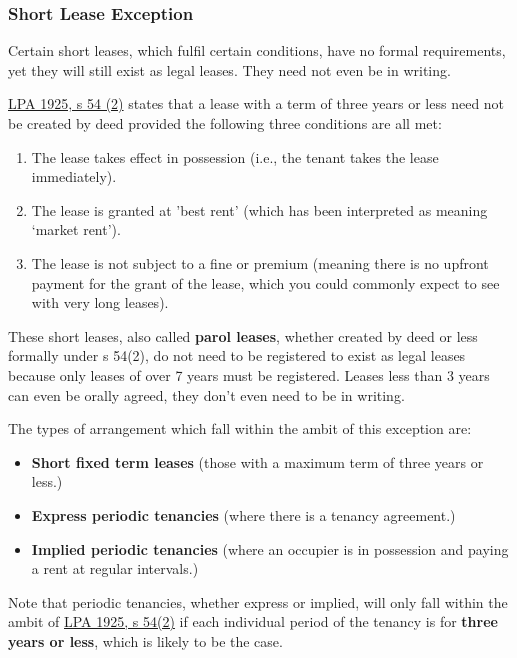 \documentclass[
]{article}
\providecommand{\tightlist}{%
  \setlength{\itemsep}{0pt}\setlength{\parskip}{0pt}}
\begin{document}
\hypertarget{short-lease-exception}{%
\subsubsection{Short Lease Exception}\label{short-lease-exception}}

Certain short leases, which fulfil certain conditions, have no formal
requirements, yet they will still exist as legal leases. They need not
even be in writing.

\href{https://www.legislation.gov.uk/ukpga/Geo5/15-16/20/section/54}{LPA
1925, s 54 (2)} states that a lease with a term of three years or less
need not be created by deed provided the following three conditions are
all met:

\begin{enumerate}
\tightlist
\item
  The lease takes effect in possession (i.e., the tenant takes the lease
  immediately).
\item
  The lease is granted at 'best rent' (which has been interpreted as
  meaning `market rent').
\item
  The lease is not subject to a fine or premium (meaning there is no
  upfront payment for the grant of the lease, which you could commonly
  expect to see with very long leases).
\end{enumerate}

These short leases, also called \textbf{parol leases}, whether created
by deed or less formally under s 54(2), do not need to be registered to
exist as legal leases because only leases of over 7 years must be
registered. Leases less than 3 years can even be orally agreed, they
don't even need to be in writing.

The types of arrangement which fall within the ambit of this exception
are:

\begin{itemize}
\tightlist
\item
  \textbf{Short fixed term leases} (those with a maximum term of three
  years or less.)
\item
  \textbf{Express periodic tenancies} (where there is a tenancy
  agreement.)
\item
  \textbf{Implied periodic tenancies} (where an occupier is in
  possession and paying a rent at regular intervals.)
\end{itemize}

Note that periodic tenancies, whether express or implied, will only fall
within the ambit of
\href{https://www.legislation.gov.uk/ukpga/Geo5/15-16/20/section/54}{LPA
1925, s 54(2)} if each individual period of the tenancy is for
\textbf{three years or less}, which is likely to be the case.
\end{document}
